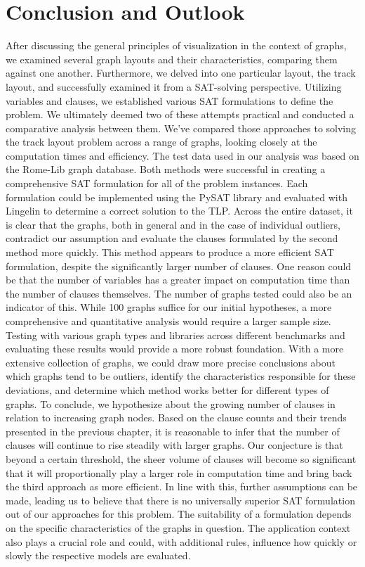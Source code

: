 \documentclass[bachelor, english]{algothesis}
\begin{document}
\chapter{Conclusion and Outlook}
After discussing the general principles of visualization in the context of graphs, we examined several graph layouts and their characteristics, comparing them against one another. Furthermore, we delved into one particular layout, the track layout, and successfully examined it from a SAT-solving perspective. Utilizing variables and clauses, we established various SAT formulations to define the problem. We ultimately deemed two of these attempts practical and conducted a comparative analysis between them. We've compared those approaches to solving the track layout problem across a range of graphs, looking closely at the computation times and efficiency. The test data used in our analysis was based on the Rome-Lib graph database.  \newline
Both methods were successful in creating a comprehensive SAT formulation for all of the problem instances. Each formulation could be implemented using the PySAT library and evaluated with Lingelin to determine a correct solution to the TLP. Across the entire dataset, it is clear that the graphs, both in general and in the case of individual outliers, contradict our assumption and evaluate the clauses formulated by the second method more quickly. This method appears to produce a more efficient SAT formulation, despite the significantly larger number of clauses. \newline
One reason could be that the number of variables has a greater impact on computation time than the number of clauses themselves. The number of graphs tested could also be an indicator of this. While 100 graphs suffice for our initial hypotheses, a more comprehensive and quantitative analysis would require a larger sample size. Testing with various graph types and libraries across different benchmarks and evaluating these results would provide a more robust foundation. With a more extensive collection of graphs, we could draw more precise conclusions about which graphs tend to be outliers, identify the characteristics responsible for these deviations, and determine which method works better for different types of graphs.  \newline
To conclude, we hypothesize about the growing number of clauses in relation to increasing graph nodes. Based on the clause counts and their trends presented in the previous chapter, it is reasonable to infer that the number of clauses will continue to rise steadily with larger graphs. Our conjecture is that beyond a certain threshold, the sheer volume of clauses will become so significant that it will proportionally play a larger role in computation time and bring back the third approach as more efficient. In line with this, further assumptions can be made, leading us to believe that there is no universally superior SAT formulation out of our approaches for this problem. The suitability of a formulation depends on the specific characteristics of the graphs in question. The application context also plays a crucial role and could, with additional rules, influence how quickly or slowly the respective models are evaluated.

\clearpage


\end{document}
